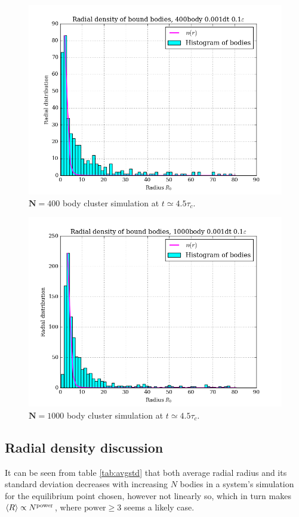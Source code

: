 \documentclass[11pt,a4paper,notitlepage,twocolumn]{article}
\begin{document}
\begin{figure}
[H]\center
\includegraphics[scale=0.35]{../figs/ClusterRadDens_400body_dt1_eps10_dur16.png}
\caption{$\mathbf{N} = 400$ body cluster simulation at $t \simeq 4.5\tau_c$.}\label{fig:N400eps10eqHist}
\end{figure}
\begin{figure}
[H]\center
\includegraphics[scale=0.35]{../figs/ClusterRadDens_1000body_dt1_eps10_dur16.png}
\caption{$\mathbf{N} = 1000$ body cluster simulation at $t \simeq 4.5\tau_c$.}\label{fig:N1000eps10eqHist}
\end{figure}

\subsection{Radial density discussion}
It can be seen from table \ref{tab:avgstd} that both average radial radius and its standard deviation decreases with increasing $N$ bodies in a system's simulation for the equilibrium point chosen, however not linearly so, which in turn makes $\braket{R} \propto N^\text{power}$, where $\text{power} \geq 3$ seems a likely case.
\end{document}
